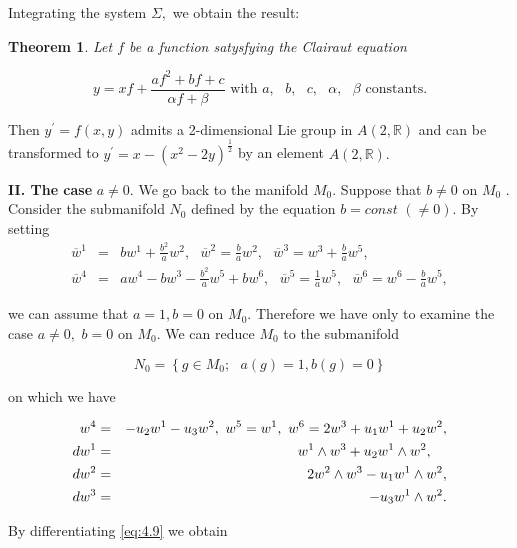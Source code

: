 \documentclass{amsproc}
\newtheorem{theorem}{Theorem}[section]
\theoremstyle{remark}
\numberwithin{equation}{section}
\begin{document}
Integrating the system $\Sigma ,$ we obtain the result:

\begin{theorem}
Let $f$ be a function satysfying the Clairaut equation

\begin{equation*}
y=xf+\frac{af^{2}+bf+c}{\alpha f+\beta }\text{ \ with }a,\text{ }b,\text{ }c,\text{ }\alpha ,\text{ }\beta \text{ constants.}
\end{equation*}
\end{theorem}

Then $y^{\prime }=f(x,y)$ admits a 2-dimensional Lie group in $A(2,\mathbb{R}
)$ and can be transformed to $y^{\prime }=x-(x^{2}-2y)^{\frac{1}{2}}$ by an
element $A(2,\mathbb{R}
).$

\textbf{II. The case }$a\neq 0.$ We go back to the manifold $M_{0}.$ Suppose
that $b\neq 0$ on $M_{0}$ . Consider the submanifold $N_{0}$ defined by the
equation $b=const$ $(\neq 0).$ By setting 
\begin{eqnarray*}
\overline{w}^{1} &=&bw^{1}+\frac{b^{2}}{a}w^{2},\text{ \ }\overline{w}^{2}=\frac{b}{a}w^{2},\text{ \ }\overline{w}^{3}=w^{3}+\frac{b}{a}w^{5}, \\
\overline{w}^{4} &=&aw^{4}-bw^{3}-\frac{b^{2}}{a}w^{5}+bw^{6},\text{ }\overline{w}^{5}=\frac{1}{a}w^{5},\text{ \ }\overline{w}^{6}=w^{6}-\frac{b}{a}w^{5},
\end{eqnarray*}

we can assume that $a=1,b=0$ on $M_{0}.$ Therefore we have only to examine
the case $a\neq 0,$ $b=0$ on $M_{0}.$ We can reduce $M_{0}$ to the
submanifold

\begin{equation*}
N_{0}=\left\{ g\in M_{0};\text{ }a(g)=1,b(g)=0\right\}
\end{equation*}

on which we have

\begin{eqnarray}
w^{4} &=&-u_{2}w^{1}-u_{3}w^{2},\text{ }w^{5}=w^{1}, \text{ }w^{6}=2w^{3}+u_{1}w^{1}+u_{2}w^{2},\notag \\
dw^{1} &=&w^{1}\wedge w^{3}+u_{2}w^{1}\wedge w^{2},
 \label{eq:4.10}
  \text{ \ \ } \\
dw^{2} &=&2w^{2}\wedge w^{3}-u_{1}w^{1}\wedge w^{2}, \notag \\
dw^{3} &=&-u_{3}w^{1}\wedge w^{2}. \notag 
\end{eqnarray}

By differentiating \eqref{eq:4.9} we obtain
\end{document}
